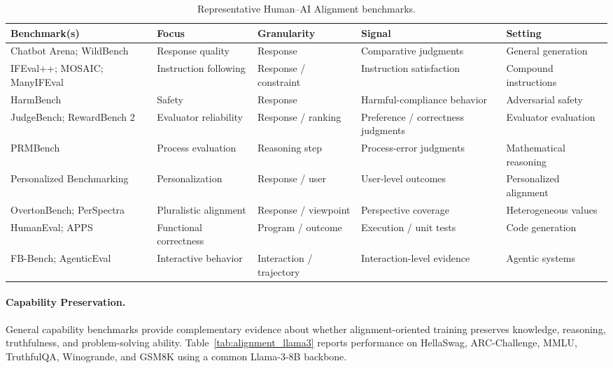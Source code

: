 \documentclass[11pt]{article}
\begin{document}
\begin{table}[t]
\centering
\small
\setlength{\tabcolsep}{4pt}
\renewcommand{\arraystretch}{1.08}
\begin{tabularx}{\textwidth}{@{}p{3.1cm}p{2.6cm}p{1.8cm}X p{2.4cm}@{}}
\toprule
\textbf{Benchmark(s)} & \textbf{Focus} & \textbf{Granularity} & \textbf{Signal} & \textbf{Setting} \\
\midrule
Chatbot Arena; WildBench \citep{chiang2024arena,lin2025wildbench} & Response quality & Response & Comparative judgments & General generation \\
IFEval++; MOSAIC; ManyIFEval \citep{dong2026ifevalpp,purpura2026mosaic,harada2025manyifeval} & Instruction following & Response / constraint & Instruction satisfaction & Compound instructions \\
HarmBench \citep{mazeika2024harmbench} & Safety & Response & Harmful-compliance behavior & Adversarial safety \\
JudgeBench; RewardBench 2 \citep{tan2025judgebench,malik2026rewardbench2} & Evaluator reliability & Response / ranking & Preference / correctness judgments & Evaluator evaluation \\
PRMBench \citep{song2025prmbench} & Process evaluation & Reasoning step & Process-error judgments & Mathematical reasoning \\
Personalized Benchmarking \citep{garbacea2026personalizedbenchmark} & Personalization & Response / user & User-level outcomes & Personalized alignment \\
OvertonBench; PerSpectra \citep{pooledayan2026overtonbench,nie2026perspectra} & Pluralistic alignment & Response / viewpoint & Perspective coverage & Heterogeneous values \\
HumanEval; APPS \citep{chen2021humaneval,hendrycks2021apps} & Functional correctness & Program / outcome & Execution / unit tests & Code generation \\
FB-Bench; AgenticEval \citep{li2025fbbench,wang2026agenticeval} & Interactive behavior & Interaction / trajectory & Interaction-level evidence & Agentic systems \\
\bottomrule
\end{tabularx}
\caption{Representative Human--AI Alignment benchmarks.}
\label{tab:alignment-benchmarks}
\end{table}

\paragraph{Capability Preservation.}
General capability benchmarks provide complementary evidence about whether alignment-oriented training preserves knowledge, reasoning, truthfulness, and problem-solving ability. Table~\ref{tab:alignment_llama3} reports performance on HellaSwag, ARC-Challenge, MMLU, TruthfulQA, Winogrande, and GSM8K using a common Llama-3-8B backbone.
\end{document}
